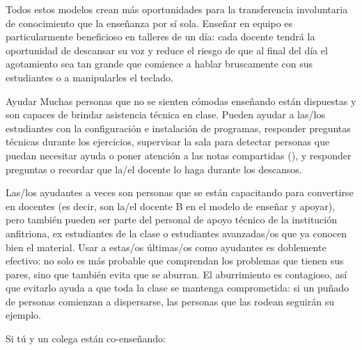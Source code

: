 Todos estos modelos crean más oportunidades para la transferencia involuntaria de conocimiento que la enseñanza por sí sola.
Enseñar en equipo es particularmente beneficioso en talleres de un día:
cada docente tendrá la oportunidad de descansar su voz
y reduce el riesgo de que al final del día el agotamiento sea tan grande
que comience a hablar bruscamente con sus estudiantes
o a manipularles el teclado.

\begin{aside}{Ayudar}
  Muchas personas que no se sienten cómodas enseñando
  están dispuestas y son capaces de brindar asistencia técnica en clase.
  Pueden ayudar a las/los estudiantes con la configuración e instalación de programas,
  responder preguntas técnicas durante los ejercicios,
  supervisar la sala para detectar personas que puedan necesitar ayuda
  o poner atención a las notas compartidas (),
  y responder preguntas
  o recordar que la/el docente lo haga durante los descansos.

  Las/los ayudantes a veces son personas que se están capacitando para convertirse en docentes
  (es decir, son la/el docente B en el modelo de enseñar y apoyar),
  pero también pueden ser parte del personal de apoyo técnico de la institución anfitriona,
  ex estudiantes de la clase
  o estudiantes avanzadas/os que ya conocen bien el material.
  Usar a estas/os últimas/os como ayudantes es doblemente efectivo: no solo es más probable que comprendan los problemas que tienen sus pares,
  sino que también evita que se aburran.
  El aburrimiento es contagioso, así que evitarlo ayuda a que toda la clase se mantenga comprometida:
  si un puñado de personas comienzan a dispersarse,
  las personas que las rodean seguirán su ejemplo.
\end{aside}

Si tú y un colega están co-enseñando:

